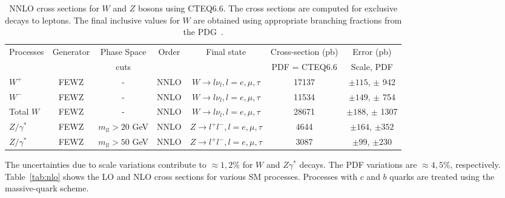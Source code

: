 \vspace{3mm}
\begin{table}[hbt]
\begin{center}
\renewcommand{\arraystretch}{1.2}
\begin{tabular}{|l|c|c|c|c|c|c|}\hline
Processes & Generator & Phase Space& Order & Final state & Cross-section (pb)& Error (pb) \\ 
 &  &  cuts & & & PDF = CTEQ6.6 & Scale, PDF \\ \hline
$W^+$ & FEWZ & - & NNLO & $W \rightarrow l \nu_l, l=e,\mu,\tau$ & 17137 & $\pm 115$, $\pm$ 942 \\ \hline
$W^-$ & FEWZ & - & NNLO & $W \rightarrow l \nu_l, l=e,\mu,\tau$ & 11534 & $\pm 149$, $\pm$ 754 \\ \hline
Total $W$ & FEWZ & - & NNLO & $W \rightarrow l \nu_l, l=e,\mu,\tau$ & 28671 & $\pm 188$, $\pm$ 1307 \\ \hline
$Z/\gamma^*$ & FEWZ & $m_{ll} > 20$ GeV & NNLO & $Z \rightarrow l^+l^-, l=e,\mu,\tau$ & 4644 & $\pm 164$, $\pm 352$ \\ \hline
$Z/\gamma^*$ & FEWZ & $m_{ll} > 50$ GeV & NNLO & $Z \rightarrow l^+l^-, l=e,\mu,\tau$ & 3087 & $\pm 99$, $\pm 230$ \\ \hline
\end{tabular} 
\caption{NNLO cross sections for $W$ and $Z$ bosons using CTEQ6.6. The cross sections are computed for
exclusive decays to leptons. The final inclusive values for $W$ are obtained using appropriate 
branching fractions from the PDG~\cite{pdg}. \label{tab:nnlo66}}
\end{center}
\end{table}


The uncertainties due to scale variations contribute to $\approx 1, 2$\% for 
$W$ and $Z\gamma^*$ decays. The PDF variations are $\approx 4, 5$\%, 
respectively. Table~\ref{tab:nlo} shows the LO and NLO cross sections for 
various SM processes. Processes with $c$ and $b$ quarks are treated using the 
massive-quark scheme.

